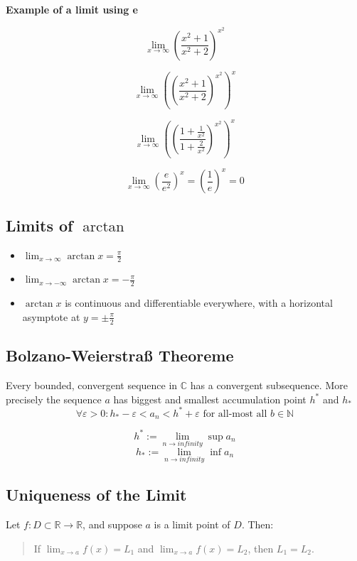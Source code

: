 \textbf{Example of a limit using e}

\[
\lim_{x \to \infty}\left(\frac{x^2 + 1}{x^2 +2}\right)^{x^2}
\]

\[
\lim_{x \to \infty} \left(\left(\frac{x^2 + 1}{x^2 +2}\right)^{x^2}\right)^x
\]

\[
\lim_{x \to \infty} \left(\left(\frac{1 + \frac{1}{x^2}}{1 + \frac{2}{x^2}}\right)^{x^2}\right)^x
\]

\[
\lim_{x \to \infty} \left(\frac{e}{e^2}\right)^x = \left(\frac{1}{e}\right)^x = 0
\]


\subsection{Limits of \texorpdfstring{\(\arctan\)}{arctan}}

\begin{itemize}[label=\(-\)]
\item \(\displaystyle \lim_{x \to \infty} \arctan x = \frac{\pi}{2}\)
\item \(\displaystyle \lim_{x \to -\infty} \arctan x = -\frac{\pi}{2}\)
\item \(\arctan x\) is continuous and differentiable everywhere, with a horizontal asymptote at \(y = \pm \frac{\pi}{2}\)
\end{itemize}

\subsection{Bolzano-Weierstraß Theoreme}

Every bounded, convergent sequence in \(\mathbb{C}\) has a convergent subsequence.
More precisely the sequence \(a\) has biggest and smallest accumulation point \(h^*\) and \(h_*\)
\[\forall \varepsilon > 0 : h_* - \varepsilon < a_n < h^{*} + \varepsilon \text{ for all-most all } b \in \mathbb{N}\]

\[h^* := \lim_{n \to infinity} \sup a_n\]
\[h_* := \lim_{n \to infinity} \inf a_n\]

\subsection{Uniqueness of the Limit}

Let \( f: D \subset \mathbb{R} \to \mathbb{R} \), and suppose \( a \) is a limit point of \( D \). Then:

\begin{quote}
If \( \lim_{x \to a} f(x) = L_1 \) and \( \lim_{x \to a} f(x) = L_2 \), then \( L_1 = L_2 \).
\end{quote}

